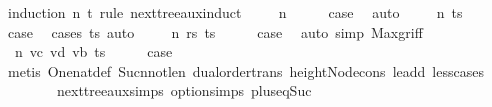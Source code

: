 \begin{isabellebody}
\isamarkupfalse%
\ {\isacharparenleft}{\kern0pt}induction\ n\ t\ rule{\isacharcolon}{\kern0pt}\ next{\isacharunderscore}{\kern0pt}tree{\isacharunderscore}{\kern0pt}aux{\isachardot}{\kern0pt}induct{\isacharparenright}{\kern0pt}\isanewline
\ \ \isamarkupfalse%
\ {\isacharparenleft}{\kern0pt}{}\ n{\isacharparenright}{\kern0pt}\isanewline
\ \ \isamarkupfalse%
\ \isamarkupfalse%
\ {\isacharquery}{\kern0pt}case\ \isamarkupfalse%
\ auto\isanewline
{}\isamarkupfalse%
\isanewline
\ \ \isamarkupfalse%
\ {\isacharparenleft}{\kern0pt}{}\ n\ ts{\isacharparenright}{\kern0pt}\isanewline
\ \ \isamarkupfalse%
\ \isamarkupfalse%
\ {\isacharquery}{\kern0pt}case\ \isamarkupfalse%
\ {\isacharparenleft}{\kern0pt}cases\ ts{\isacharparenright}{\kern0pt}\ auto\isanewline
{}\isamarkupfalse%
\isanewline
\ \ \isamarkupfalse%
\ {\isacharparenleft}{\kern0pt}{}\ n\ rs\ ts{\isacharparenright}{\kern0pt}\isanewline
\ \ \isamarkupfalse%
\ \isamarkupfalse%
\ {\isacharquery}{\kern0pt}case\ \isamarkupfalse%
\ {\isacharparenleft}{\kern0pt}auto\ simp{\isacharcolon}{\kern0pt}\ Max{\isacharunderscore}{\kern0pt}gr{\isacharunderscore}{\kern0pt}iff{\isacharparenright}{\kern0pt}\isanewline
{}\isamarkupfalse%
\isanewline
\ \ \isamarkupfalse%
\ {\isacharparenleft}{\kern0pt}{}\ n\ vc\ vd\ vb\ ts{\isacharparenright}{\kern0pt}\isanewline
\ \ \isamarkupfalse%
\ \isamarkupfalse%
\ {\isacharquery}{\kern0pt}case\ \isanewline
\ \ \ \ \isamarkupfalse%
\ {\isacharparenleft}{\kern0pt}metis\ One{\isacharunderscore}{\kern0pt}nat{\isacharunderscore}{\kern0pt}def\ Suc{\isacharunderscore}{\kern0pt}n{\isacharunderscore}{\kern0pt}not{\isacharunderscore}{\kern0pt}le{\isacharunderscore}{\kern0pt}n\ dual{\isacharunderscore}{\kern0pt}order{\isachardot}{\kern0pt}trans\ height{\isacharunderscore}{\kern0pt}Node{\isacharunderscore}{\kern0pt}cons\ le{\isacharunderscore}{\kern0pt}add{}\ less{\isacharunderscore}{\kern0pt}{}{\isacharunderscore}{\kern0pt}cases\isanewline
\ \ \ \ \ \ \ \ next{\isacharunderscore}{\kern0pt}tree{\isacharunderscore}{\kern0pt}aux{\isachardot}{\kern0pt}simps{\isacharparenleft}{\kern0pt}{}{\isacharparenright}{\kern0pt}\ option{\isachardot}{\kern0pt}simps{\isacharparenleft}{\kern0pt}{}{\isacharparenright}{\kern0pt}\ plus{\isacharunderscore}{\kern0pt}{}{\isacharunderscore}{\kern0pt}eq{\isacharunderscore}{\kern0pt}Suc{\isacharparenright}{\kern0pt}\isanewline

\end{isabellebody}
